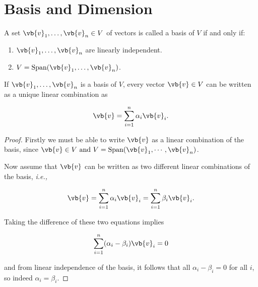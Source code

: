 \documentclass[a4paper,12pt]{report}
\begin{document}
\section{Basis and Dimension}
\begin{definition}
A set \(\vb{v} _{1}, \ldots , \vb{v} _{n} \in V \) of vectors is called a basis of \(V\) if and only if:

\begin{enumerate}[label=(\(C\)\arabic*)] \label{basis} 
    \item \(\vb{v} _{1}, \ldots , \vb{v} _{n}  \) are linearly independent.
    \item \(V = \text{Span}(\vb{v} _{1}, \ldots , \vb{v} _{n}  ) \).
\end{enumerate}
\end{definition}

\begin{lemma} \label{uniquelinear} 
If \(\vb{v} _{1}, \ldots ,\vb{v} _{n}  \) is a basis of \(V\), every vector \(\vb{v} \in V\) can be written as a unique linear combination as

\begin{equation}
    \vb{v} = \sum_{i=1}^{n} \alpha _{i} \vb{v} _{i}  .
\end{equation}

\end{lemma}

\begin{proof}
Firstly we must be able to write \(\vb{v} \) as a linear combination of the basis, since \(\vb{v} \in V \text { and } V = \text{Span} (\vb{v}_1, \cdots, \vb{v}_n ) \).   

Now assume that \(\vb{v} \) can be written as two different linear combinations of the basis, \textit{i.e.,} 

\begin{equation}
    \vb{v} = \sum_{i=1}^{n} \alpha _{i}\vb{v} _{i} = \sum_{i=1}^{n} \beta _{i} \vb{v} _{i}.  
\end{equation}

Taking the difference of these two equations implies

\begin{equation}
    \sum_{i=1}^{n} (\alpha _{i} - \beta _{i}  )\vb{v} _{i} =0
\end{equation}

and from linear independence of the basis, it follows that all \(\alpha _{i} - \beta _{i} = 0  \) for all \(i\), so indeed \(\alpha _{i} = \beta _{i}  \). 
\end{proof}
\end{document}
